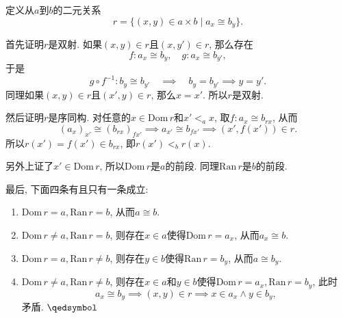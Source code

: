 \documentclass[UTF8]{ctexart}
\begin{document}
\vspace{3pt}


\vspace{3pt}

定义从$a$到$b$的二元关系
\[
    r=\{(x,y)\in a\times b\mid a_x\cong b_y\}.
\]

首先证明$r$是双射. 如果$(x,y)\in r$且$(x,y')\in r$, 那么存在
\[
    f:a_x\cong b_y,\quad g:a_x\cong b_{y'},
\]
于是
\[
    g\circ f^{-1}:b_y\cong b_{y'}\quad\implies\quad b_y=b_{y'}\implies y=y'.
\]
同理如果$(x,y)\in r$且$(x',y)\in r$, 那么$x=x'$. 所以$r$是双射.

\vspace{3pt}

然后证明$r$是序同构. 对任意的$x\in\mathrm{Dom}\,r$和$x'<_ax$,
取$f:a_x\cong b_{rx}$, 从而
\[
    (a_x)_{x'}\cong(b_{rx})_{fx'}\implies a_{x'}\cong b_{fx'}
    \implies(x',f(x'))\in r.
\]
所以$r(x')=f(x')\in b_{rx}$, 即$r(x')<_br(x)$.

另外上证了$x'\in\mathrm{Dom}\,r$, 所以$\mathrm{Dom}\,r$是$a$的前段.
同理$\mathrm{Ran}\,r$是$b$的前段.

\vspace{3pt}

最后, 下面四条有且只有一条成立:
\begin{enumerate}
    \item $\mathrm{Dom}\,r=a,\mathrm{Ran}\,r=b$, 从而$a\cong b$.
    \item $\mathrm{Dom}\,r\neq a,\mathrm{Ran}\,r=b$,
    则存在$x\in a$使得$\mathrm{Dom}\,r=a_x$, 从而$a_x\cong b$.
    \item $\mathrm{Dom}\,r=a,\mathrm{Ran}\,r\neq b$,
    则存在$y\in b$使得$\mathrm{Ran}\,r=b_y$, 从而$a\cong b_y$.
    \item $\mathrm{Dom}\,r\neq a,\mathrm{Ran}\,r\neq b$,
    则存在$x\in a$和$y\in b$使得$\mathrm{Dom}\,r=a_x,\mathrm{Ran}\,r=b_y$, 此时
    \[
        a_x\cong b_y\implies(x,y)\in r\implies x\in a_x\land y\in b_y,
    \]
    矛盾. \hfill $\qedsymbol$
\end{enumerate}
\end{document}
